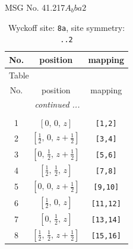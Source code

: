 \documentclass[fleqn,8pt]{jsarticle}
\begin{document}
\setcounter{MaxMatrixCols}{32}

\renewcommand{\tablename}{Table~}
\renewcommand{\figurename}{Figure~}
\begin{center}
\LARGE
MSG No. 41.217\quad$A_{b}ba2$
\end{center}
\renewcommand{\arraystretch}{1.2}
\begin{longtable}{ccc}
\caption{Wyckoff site: {\tt 8a}, site symmetry: {\tt ..2}}
 \\
 \hline \hline
No. & position & mapping \\ \hline \endfirsthead

\multicolumn{2}{l}{\tablename\ \thetable{}} \\
 \hline \hline
No. & position & mapping \\ \hline \endhead

 \hline \hline
\multicolumn{2}{r}{\footnotesize\it continued ...} \\ \endfoot

 \hline \hline
\multicolumn{2}{r}{} \\ \endlastfoot

1 & $\left[ 0,\, 0,\, z \right]$ & {\tt [1,2]} \\ \hline
2 & $\left[ \frac{1}{2},\, 0,\, z + \frac{1}{2} \right]$ & {\tt [3,4]} \\ \hline
3 & $\left[ 0,\, \frac{1}{2},\, z + \frac{1}{2} \right]$ & {\tt [5,6]} \\ \hline
4 & $\left[ \frac{1}{2},\, \frac{1}{2},\, z \right]$ & {\tt [7,8]} \\ \hline
5 & $\left[ 0,\, 0,\, z + \frac{1}{2} \right]$ & {\tt [9,10]} \\ \hline
6 & $\left[ \frac{1}{2},\, 0,\, z \right]$ & {\tt [11,12]} \\ \hline
7 & $\left[ 0,\, \frac{1}{2},\, z \right]$ & {\tt [13,14]} \\ \hline
8 & $\left[ \frac{1}{2},\, \frac{1}{2},\, z + \frac{1}{2} \right]$ & {\tt [15,16]} \\
\end{longtable}
\renewcommand{\arraystretch}{1.2}
\end{document}
